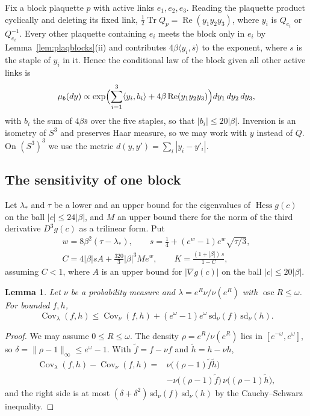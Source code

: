 \documentclass[aps,prd,twocolumn,superscriptaddress,nofootinbib,longbibliography,floatfix,amsmath,amssymb,10pt]{revtex4-2}
\newtheorem{lemma}[theorem]{Lemma}
\theoremstyle{definition}
\theoremstyle{remark}
\newcommand{\Tr}{\operatorname{Tr}}
\newcommand{\Hess}{\operatorname{Hess}}
\newcommand{\Cov}{\operatorname{Cov}}
\newcommand{\ip}[2]{\langle #1,#2\rangle}
\begin{document}
Fix a block plaquette $p$ with active links $e_1,e_2,e_3$. Reading the
plaquette product cyclically and deleting its fixed link, $\frac12\Tr Q_p=
\operatorname{Re}(y_1y_2y_3)$, where $y_i$ is $Q_{e_i}$ or $Q_{e_i}^{-1}$.
Every other plaquette containing $e_i$ meets the block only in $e_i$ by
Lemma~\ref{lem:plaqblocks}(ii) and contributes $4\beta\ip{y_i}{\bar s}$ to
the exponent, where $s$ is the staple of $y_i$ in it. Hence the conditional
law of the block given all other active links is
\begin{equation}\label{eq:blocklaw}
\mu_b(dy)\propto\exp\Bigl(\sum_{i=1}^3\ip{y_i}{b_i}+4\beta\operatorname{Re}
(y_1y_2y_3)\Bigr)dy_1\,dy_2\,dy_3,
\end{equation}
with $b_i$ the sum of $4\beta\bar s$ over the five staples, so that
$|b_i|\le20|\beta|$. Inversion is an isometry of $S^3$ and preserves Haar
measure, so we may work with $y$ instead of $Q$. On $(S^3)^3$ we use the
metric $d(y,y')=\sum_i|y_i-y'_i|$.

\subsection{The sensitivity of one block}

Let $\lambda_*$ and $\tau$ be a lower and an upper bound for the
eigenvalues of $\Hess g(c)$ on the ball $|c|\le24|\beta|$, and $M$ an upper
bound there for the norm of the third derivative $D^3g(c)$ as a trilinear
form. Put
\begin{equation}\label{eq:blockconst}
\begin{gathered}
w=8\beta^2(\tau-\lambda_*),\qquad s=\tfrac14+(e^w-1)e^w\sqrt{\tau/3},\\
C=4|\beta|sA+\tfrac{320}3|\beta|^3Me^w,\qquad
K=\frac{(1+|\beta|)\,s}{1-C},
\end{gathered}
\end{equation}
assuming $C<1$, where $A$ is an upper bound for $|\nabla g(c)|$ on the ball
$|c|\le20|\beta|$.

\begin{lemma}\label{lem:tilt}
Let $\nu$ be a probability measure and $\lambda=e^R\nu/\nu(e^R)$ with
$\operatorname{osc}R\le\omega$. For bounded $f,h$,
\[
\Cov_\lambda(f,h)\le\Cov_\nu(f,h)+(e^\omega-1)e^\omega\,\mathrm{sd}_\nu(f)
\,\mathrm{sd}_\nu(h).
\]
\end{lemma}

\begin{proof}
We may assume $0\le R\le\omega$. The density $\rho=e^R/\nu(e^R)$ lies in
$[e^{-\omega},e^\omega]$, so $\delta=\|\rho-1\|_\infty\le e^\omega-1$. With
$\tilde f=f-\nu f$ and $\tilde h=h-\nu h$,
\[
\begin{split}
\Cov_\lambda(f,h)-\Cov_\nu(f,h)={}&\nu\bigl((\rho-1)\tilde f\tilde h\bigr)\\
&-\nu\bigl((\rho-1)\tilde f\bigr)\,\nu\bigl((\rho-1)\tilde h\bigr),
\end{split}
\]
and the right side is at most $(\delta+\delta^2)\,\mathrm{sd}_\nu(f)\,
\mathrm{sd}_\nu(h)$ by the Cauchy--Schwarz inequality.
\end{proof}
\end{document}
